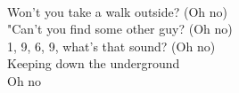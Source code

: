 \\
Won't you take a walk outside? (Oh no) \\
"Can't you find some other guy? (Oh no) \\
1, 9, 6, 9, what's that sound? (Oh no) \\
Keeping down the underground \\
Oh no \\
